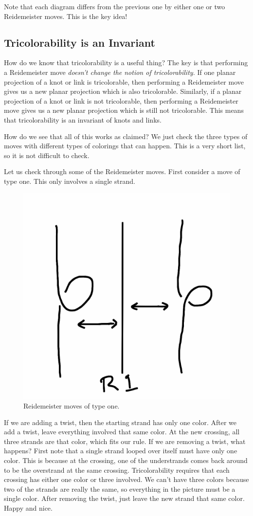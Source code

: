 \documentclass[12pt,letterpaper]{article}
\theoremstyle{definition}
\begin{document}
Note that each diagram differs from the previous one by either one or two Reidemeister moves. 
This is the key idea!

\subsection*{Tricolorability is an Invariant}

How do we know that tricolorability is a useful thing?
The key is that performing a Reidemeister move \emph{doesn't change the notion of tricolorability.}
If one planar projection of a knot or link is tricolorable, then performing a Reidemeister move gives us a new planar projection which is also tricolorable.
Similarly, if a planar projection of a knot or link is not tricolorable, then performing a Reidemeister move gives us a new planar projection which is still not tricolorable.
This means that tricolorability is an invariant of knots and links.

How do we see that all of this works as claimed?
We just check the three types of moves with different types of colorings that can happen.
This is a very short list, so it is not difficult to check.

Let us check through some of the Reidemeister moves.
First consider a move of type one.
This only involves a single strand.

\begin{figure}[h]
    \centering
    \includegraphics[width=.3\textwidth]{rgp08pics/r1.png}
    \caption{Reidemeister moves of type one.}
\end{figure}

If we are adding a twist, then the starting strand has only one color.
After we add a twist, leave everything involved that same color.
At the new crossing, all three strands are that color, which fits our rule.
If we are removing a twist, what happens?
First note that a single strand looped over itself must have only one color. This is because at the crossing, one of the understrands comes back around to be the overstrand at the same crossing.
Tricolorability requires that each crossing has either one color or three involved.
We can't have three colors because two of the strands are really the same, so everything in the picture must be a single color.
After removing the twist, just leave the new strand that same color.
Happy and nice.
\end{document}
